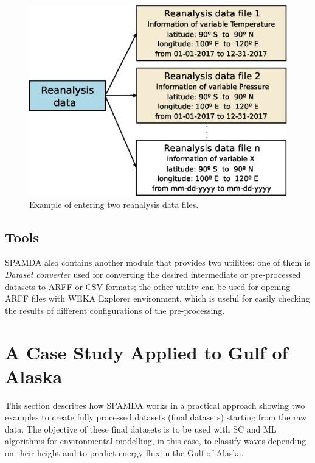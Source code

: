 \documentclass[energies,article,accept,moreauthors,pdftex]{Definitions/mdpi}
\begin{document}
\begin{paracol}{2}
				\begin{figure}[H]
					\includegraphics[scale=0.45]{figures/FigureManageReanalisys.eps}
					\caption{Example of entering two reanalysis data files.}
					\label{fig:manageReanalisys}
				\end{figure}
				
			\subsection{Tools}
			
				SPAMDA also contains another module that provides two utilities: one of them is \textit{Dataset converter} used for converting the desired intermediate or pre-processed datasets to ARFF or CSV formats; the other utility can be used for opening ARFF files with WEKA Explorer environment, which is useful for easily checking the results of different configurations of the pre-processing.
				
	\section{A Case Study Applied to Gulf of Alaska}\label{sec:CaseStudy}
		
		This section describes how SPAMDA works in a practical approach showing two examples to create fully processed datasets (final datasets) starting from the raw data. The objective of these final datasets is to be used with SC and ML algorithms for environmental modelling, in this case, to classify waves depending on their height and to predict energy flux in the Gulf of Alaska.
		

\end{paracol}
\end{document}
